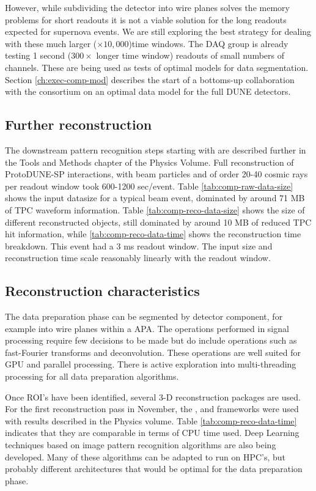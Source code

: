 However,  while subdividing the detector into wire planes solves the memory problems for short readouts it is  not a viable solution for the long readouts expected for supernova events. We are still exploring the best strategy for dealing with these much larger ($\times 10,000$)time windows. The DAQ group is already testing 1 second ($300 \times$ longer time window) readouts of small numbers of channels.  These are being used as tests of optimal models for data segmentation.  Section \ref{ch:exec-comp-mod} describes the start of a bottoms-up collaboration with the  consortium on an optimal data model for the full DUNE detectors.

\subsection{Further reconstruction}
The downstream pattern recognition steps starting with  are described further in the Tools and Methods chapter of the Physics Volume.
Full reconstruction of ProtoDUNE-SP interactions, with beam particles and of order 20-40 cosmic rays per readout window took 600-1200 sec/event.
Table  \ref{tab:comp-raw-data-size} shows the input datasize for a typical beam event, dominated by around 71 MB of TPC waveform information. Table  \ref{tab:comp-reco-data-size} shows the size of different reconstructed objects, still dominated by around 10 MB of reduced TPC hit information,  while \ref{tab:comp-reco-data-time} shows the reconstruction time breakdown.  This event had a 3 ms readout window.  The input size and reconstruction time scale reasonably linearly with the readout window.

\subsection{Reconstruction characteristics}

The data preparation phase can be segmented by detector component, for example into wire planes within a APA.  The operations performed in signal processing require few decisions to be made but do include operations such as fast-Fourier transforms and deconvolution.  These operations are well suited for GPU and parallel processing. There is active exploration into multi-threading processing for all data preparation algorithms.


Once ROI's have been identified, several 3-D reconstruction packages are used. For the first reconstruction pass in November, the  \cite{Acciarri:2017hat}, \cite{wirecell} and \cite{ref:PMA}  frameworks were used with results described in the Physics volume.   Table \ref{tab:comp-reco-data-time} indicates that they are comparable in terms of CPU time used.   Deep Learning techniques based on image pattern recognition algorithms are also being developed. Many of these algorithms can be adapted to run on HPC's, but probably different architectures that would be optimal for the data preparation phase.

